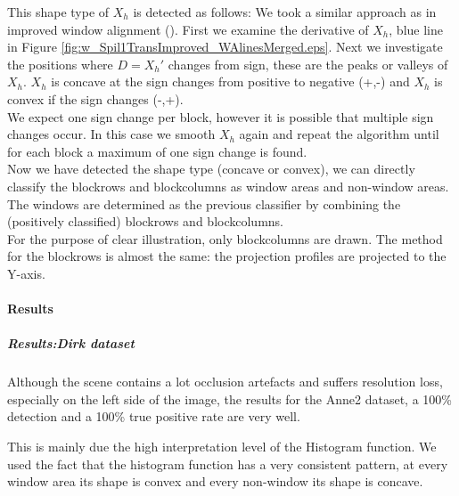 This shape type of $X_h$ is detected as follows:
We took a similar approach as in improved window alignment (). First we examine the derivative of $X_h$, blue line in Figure
\ref{fig:w_Spil1TransImproved_WAlinesMerged.eps}.  Next we investigate the positions
where $D=X_{h}'$ changes from sign, these are the peaks or valleys of $X_h$.
$X_h$ is concave at the sign changes from positive to negative (+,-) and $X_h$
is convex if the sign changes (-,+).\\

We expect one sign change per block, however it is possible that multiple sign
changes occur. In this case we smooth $X_h$ again and repeat the algorithm
until for each block a maximum of one sign change is found. \\

Now we have detected the shape type (concave or convex), we can directly
classify the blockrows and blockcolumns as window areas and non-window areas.
The windows are determined as the previous classifier by combining the
(positively classified) blockrows and blockcolumns.\\

For the purpose of clear illustration, only blockcolumns are drawn. The method for
the blockrows is almost the same: the projection profiles are projected to the
Y-axis.

\newpage
\paragraph{Results} %

\subparagraph{Results:Dirk dataset}

Although the scene contains a lot occlusion artefacts and suffers resolution
loss, especially on the left side of the image, the results for the Anne2
dataset, a 100\% detection and a 100\% true positive rate are very well.

This is mainly due the high interpretation level of the Histogram function.  We
used the fact that the histogram function has a very consistent pattern, at
every window area its shape is convex and every non-window its shape is concave.
\clearpage


